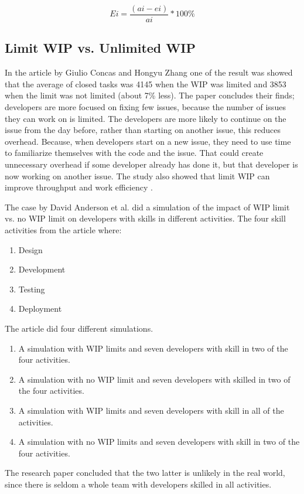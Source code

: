 \documentclass[UKenglish]{ifimaster}  %
\begin{document}
\begin{equation} \label{WIPEQ}
Ei=\frac{(ai-ei)}{ai}*100\%
\end{equation}

\subsection {Limit WIP vs. Unlimited WIP}
\label{sub:wip:vs:wip}
In the article by Giulio Concas and Hongyu Zhang one of the result was showed that the average of closed tasks was 4145 when the WIP was limited and 3853 when the limit was not limited (about 7\% less). The paper concludes their finds; developers are more focused on fixing few issues, because the number of issues they can work on is limited. The developers are more likely to continue on the issue from the day before, rather than starting on another issue, this reduces overhead. Because, when developers start on a new issue, they need to use time to familiarize themselves with the code and the issue. That could create unnecessary overhead if some developer already has done it, but that developer is now working on another issue. The study also showed that limit WIP can improve throughput and work efficiency \parencite{SMR:SMR1599}.

The case by David Anderson et al. \parencite{DavidAnderson} did a simulation of the impact of WIP limit vs. no WIP limit on developers with skills in different activities. The four skill activities from the article where:
\begin{enumerate}
\item Design
\item Development
\item Testing
\item Deployment
\end{enumerate}

The article did four different simulations. 
\begin{enumerate}
\item A simulation with WIP limits and seven developers with skill in two of the four activities. 
\item A simulation with no WIP limit and seven developers with skilled in two of the four activities. 
\item A simulation with WIP limits and seven developers with skill in all of the activities.
\item A simulation with no WIP limits and seven developers with skill in two of the four activities.
\end{enumerate}
The research paper concluded that the two latter is unlikely in the real world, since there is seldom a whole team with developers skilled in all activities.
 
\end{document}
